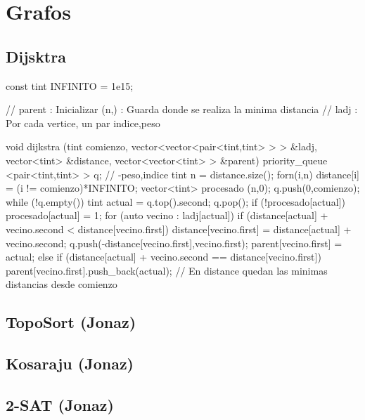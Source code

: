 \section{Grafos}

\subsection{Dijsktra}
\begin{code}
const tint INFINITO = 1e15;

// parent : Inicializar (n,{}) : Guarda donde se realiza la minima distancia
// ladj : Por cada vertice, un par {indice,peso}

void dijkstra (tint comienzo, vector<vector<pair<tint,tint> > > &ladj, 
vector<tint> &distance, vector<vector<tint> > &parent)
{
	priority_queue <pair<tint,tint> > q; // {-peso,indice}
	tint n = distance.size();
	forn(i,n)
		distance[i] = (i != comienzo)*INFINITO;
	vector<tint> procesado (n,0);
	q.push({0,comienzo});
	while (!q.empty())
	{
		tint actual = q.top().second;
		q.pop();
		if (!procesado[actual])
		{
			procesado[actual] = 1;
			for (auto vecino : ladj[actual])
			{
				if (distance[actual] + vecino.second < distance[vecino.first])
				{
					distance[vecino.first] = distance[actual] + vecino.second;
					q.push({-distance[vecino.first],vecino.first});
					parent[vecino.first] = {actual};
				}
				else if (distance[actual] + vecino.second == distance[vecino.first])
					parent[vecino.first].push_back(actual);
			}
		}
	}
}
// En distance quedan las minimas distancias desde comienzo
\end{code}

\subsection{TopoSort (Jonaz)}
\begin{code}
\end{code}

\subsection{Kosaraju (Jonaz)}
\begin{code}
\end{code}

\subsection{2-SAT (Jonaz)}
\begin{code}
\end{code}

